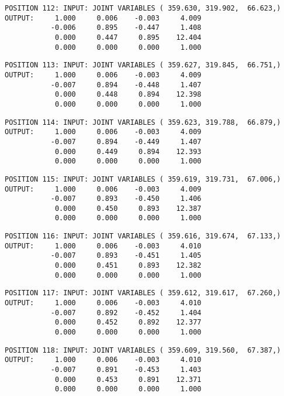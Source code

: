 \begin{verbatim}
POSITION 112: INPUT: JOINT VARIABLES ( 359.630, 319.902,  66.623,)
OUTPUT:     1.000     0.006    -0.003     4.009
           -0.006     0.895    -0.447     1.408
            0.000     0.447     0.895    12.404
            0.000     0.000     0.000     1.000
\end{verbatim} \pagebreak[1]\begin{verbatim}
POSITION 113: INPUT: JOINT VARIABLES ( 359.627, 319.845,  66.751,)
OUTPUT:     1.000     0.006    -0.003     4.009
           -0.007     0.894    -0.448     1.407
            0.000     0.448     0.894    12.398
            0.000     0.000     0.000     1.000
\end{verbatim} \pagebreak[1]\begin{verbatim}
POSITION 114: INPUT: JOINT VARIABLES ( 359.623, 319.788,  66.879,)
OUTPUT:     1.000     0.006    -0.003     4.009
           -0.007     0.894    -0.449     1.407
            0.000     0.449     0.894    12.393
            0.000     0.000     0.000     1.000
\end{verbatim} \pagebreak[1]\begin{verbatim}
POSITION 115: INPUT: JOINT VARIABLES ( 359.619, 319.731,  67.006,)
OUTPUT:     1.000     0.006    -0.003     4.009
           -0.007     0.893    -0.450     1.406
            0.000     0.450     0.893    12.387
            0.000     0.000     0.000     1.000
\end{verbatim} \pagebreak[1]\begin{verbatim}
POSITION 116: INPUT: JOINT VARIABLES ( 359.616, 319.674,  67.133,)
OUTPUT:     1.000     0.006    -0.003     4.010
           -0.007     0.893    -0.451     1.405
            0.000     0.451     0.893    12.382
            0.000     0.000     0.000     1.000
\end{verbatim} \pagebreak[1]\begin{verbatim}
POSITION 117: INPUT: JOINT VARIABLES ( 359.612, 319.617,  67.260,)
OUTPUT:     1.000     0.006    -0.003     4.010
           -0.007     0.892    -0.452     1.404
            0.000     0.452     0.892    12.377
            0.000     0.000     0.000     1.000
\end{verbatim} \pagebreak[1]\begin{verbatim}
POSITION 118: INPUT: JOINT VARIABLES ( 359.609, 319.560,  67.387,)
OUTPUT:     1.000     0.006    -0.003     4.010
           -0.007     0.891    -0.453     1.403
            0.000     0.453     0.891    12.371
            0.000     0.000     0.000     1.000
\end{verbatim} \pagebreak[1]\begin{verbatim}

\end{verbatim}
